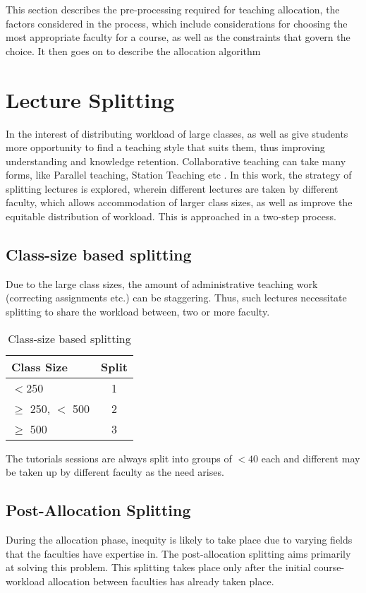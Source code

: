 
This section describes the  pre-processing required for teaching allocation, the factors considered in the process, which include considerations for choosing the most appropriate faculty for a course, as well as the constraints that govern the choice. It then goes on to describe the allocation algorithm

\section{Lecture Splitting}
\label{chapter:lecture_splitting}

In the interest of distributing workload of large classes, as well as give students more opportunity to find a teaching style that suits them, thus improving understanding and knowledge retention. Collaborative teaching can take many forms, like Parallel teaching, Station Teaching etc \parencite{forbes2012successful}. In this work, the strategy of splitting lectures is explored, wherein different lectures are taken by different faculty, which allows accommodation of larger class sizes, as well as improve the equitable distribution of workload. This is approached in a two-step process.

\subsection{Class-size based splitting}
Due to the large class sizes, the amount of administrative teaching work (correcting assignments etc.) can be staggering. Thus, such lectures necessitate splitting to share the workload between, two or more faculty.

\begin{table}
	\centering
	\begin{tabular}{|l|c|}
		\hline
        Class Size & Split\\
        \hline
        \(<\)250 & 1 \\
        \(\ge\) 250, \(<\) 500 & 2 \\
        \(\ge\) 500 & 3 \\
        \hline
	\end{tabular}
    \caption{Class-size based splitting}
    \label{class_size_splitting}
\end{table}

The tutorials sessions are always split into groups of \(< 40\) each and different may be taken up by different faculty as the need arises.

\subsection{Post-Allocation Splitting}
During the allocation phase, inequity is likely to take place due to varying fields that the faculties have expertise in. The post-allocation splitting aims primarily at solving this problem. This splitting takes place only after the initial course-workload allocation between faculties has already taken place.

